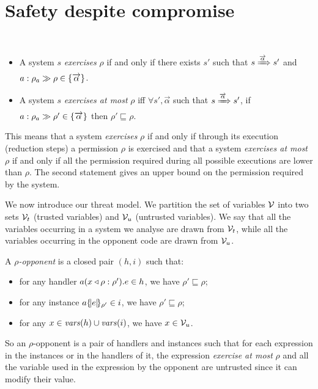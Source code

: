 \section{Safety despite compromise}
\label{sec:SafDespComp}
\begin{definition}[Exercise]
\label{def:exercise}
\mbox{ }
\begin{itemize}
\item A system $s$ \emph{exercises} $\rho$ if and only if there exists
  $s'$ such that $s \xRa{\vec{\alpha}} s'$ and $\labex{a}{\rho_a}{\rho} \in
  \{\vec{\alpha}\}$. 
\item A system $s$ \emph{exercises at most} $\rho$ iff
$\forall s',\vec{\alpha}$ such that $s\xRa{\vec{\alpha}}s'$, if
$\labex{a}{\rho_a}{\rho'}\in \{\vec{\alpha}\}$ then $\rho'\sqsubseteq\rho$.
\end{itemize}
\end{definition}
This means that a system \emph{exercises} $\rho$ if and only if through its execution (reduction steps) a permission $\rho$ is exercised and that a system \emph{exercises at most} $\rho$ if and only if all the permission required during all possible executions are lower than $\rho$. The second statement gives an upper bound on the permission required by the system.

We now introduce our threat model. We partition the set of variables $\vars$ into two sets $\vars_t$ (trusted variables) and $\vars_u$ (untrusted variables). We say that all the variables occurring in a system we analyse are drawn from $\vars_t$, while all the variables occurring in the opponent code are drawn from $\vars_u$.

\begin{definition}[Opponent]
\label{def:opponent}
A \emph{$\rho$-opponent} is a closed pair $(h,i)$ such that:
\begin{itemize}
\item for any handler $\handler{a}{x}{\rho}{e}{\rho'} \in h$, we have $\rho' \sqsubseteq \rho$;
\item for any instance $\inst{a}{e}{\rho'} \in i$, we have $\rho' \sqsubseteq \rho$;
\item for any $x \in \fvbv(h) \cup \fvbv(i)$, we have $x \in \vars_u$.
\end{itemize}
\end{definition}
So an $\rho$-opponent is a pair of handlers and instances such that for each expression in the instances or in the handlers of it, the expression \emph{exercise at most} $\rho$ and all the variable used in the expression by the opponent are untrusted since it can modify their value.

